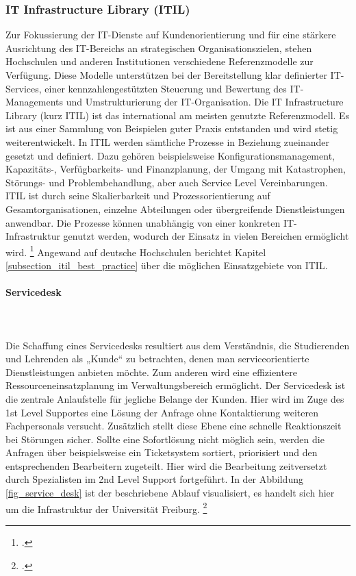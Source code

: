 \subsubsection{IT Infrastructure Library (ITIL)}
\label{subsubsection_ITIL}
Zur Fokussierung der IT-Dienste auf Kundenorientierung und für eine stärkere Ausrichtung des 
IT-Bereichs an strategischen Organisationszielen, stehen Hochschulen und anderen Institutionen 
verschiedene Referenzmodelle zur Verfügung. Diese Modelle unterstützen bei der Bereitstellung klar 
definierter IT-Services, einer kennzahlengestützten Steuerung und Bewertung des IT-Managements und 
Umstrukturierung der IT-Organisation. Die IT Infrastructure Library (kurz ITIL) ist das international am 
meisten genutzte Referenzmodell. Es ist aus einer Sammlung von Beispielen guter Praxis entstanden 
und wird stetig weiterentwickelt. In ITIL werden sämtliche Prozesse in Beziehung zueinander gesetzt 
und definiert. Dazu gehören beispielsweise Konfigurationsmanagement, Kapazitäts-, Verfügbarkeits- 
und Finanzplanung, der Umgang mit Katastrophen, Störungs- und Problembehandlung, aber auch 
Service Level Vereinbarungen. ITIL ist durch seine Skalierbarkeit und Prozessorientierung auf 
Gesamtorganisationen, einzelne Abteilungen oder übergreifende Dienstleistungen anwendbar. Die 
Prozesse können unabhängig von einer konkreten IT-Infrastruktur genutzt werden, wodurch der 
Einsatz in vielen Bereichen ermöglicht wird. \footcite[Vgl.][34]{leitner_itil_2008} Angewand auf deutsche Hochschulen berichtet Kapitel \ref{subsection_itil_best_practice} über die möglichen Einsatzgebiete von ITIL.

\paragraph{Servicedesk}\mbox{}\\\\	
\label{subsubsection_service_desk}
Die Schaffung eines Servicedesks resultiert aus dem Verständnis, die Studierenden und Lehrenden als 
„Kunde“ zu betrachten, denen man serviceorientierte Dienstleistungen anbieten möchte. Zum anderen 
wird eine effizientere Ressourceneinsatzplanung im Verwaltungsbereich ermöglicht. Der Servicedesk ist 
die zentrale Anlaufstelle für jegliche Belange der Kunden. Hier wird im Zuge des 1st Level Supportes eine Lösung 
der Anfrage ohne Kontaktierung weiteren Fachpersonals versucht. Zusätzlich stellt diese Ebene eine 
schnelle Reaktionszeit bei Störungen sicher. Sollte eine Sofortlösung nicht möglich sein, werden die 
Anfragen über beispielsweise ein Ticketsystem sortiert, priorisiert und den entsprechenden Bearbeitern zugeteilt. Hier wird die Bearbeitung zeitversetzt durch Spezialisten im 2nd Level Support fortgeführt. In der Abbildung \ref{fig_service_desk} ist der beschriebene Ablauf visualisiert, es handelt sich hier um die Infrastruktur der Universität Freiburg. \footcite[Vgl.][5]{klug_2008}

